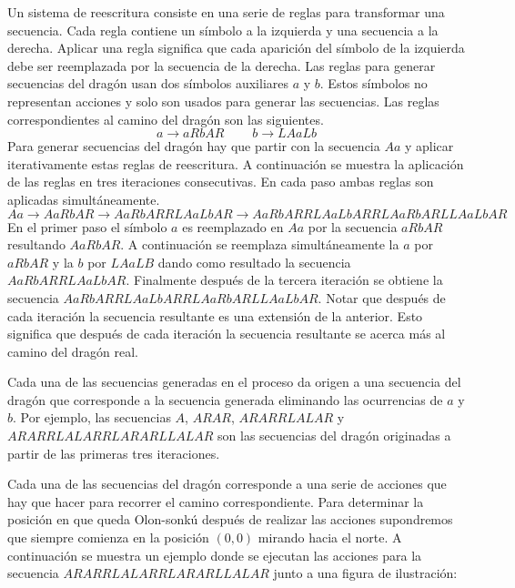 \documentclass{oci}
\begin{document}
Un sistema de reescritura consiste en una serie de reglas para transformar una secuencia.
Cada regla contiene un símbolo a la izquierda y una secuencia a la derecha.
Aplicar una regla significa que cada aparición del símbolo de la izquierda debe ser reemplazada por la secuencia de la derecha.
Las reglas para generar secuencias del dragón usan dos símbolos auxiliares $a$ y $b$.
Estos símbolos no representan acciones y solo son usados para generar las secuencias.
Las reglas correspondientes al camino del dragón son las siguientes.
$$a \rightarrow aRbAR \ \ \ \ \ \ \ \ \ \   b \rightarrow LAaLb$$
Para generar secuencias del dragón hay que partir con la secuencia $Aa$ y aplicar iterativamente estas reglas de reescritura.
A continuación se muestra la aplicación de las reglas en tres iteraciones consecutivas.
En cada paso ambas reglas son aplicadas simultáneamente.
$$Aa \rightarrow AaRbAR \rightarrow AaRbARRLAaLbAR \rightarrow AaRbARRLAaLbARRLAaRbARLLAaLbAR$$
En el primer paso el símbolo $a$ es reemplazado en $Aa$ por la secuencia $aRbAR$ resultando $AaRbAR$.
A continuación se reemplaza simultáneamente la $a$ por $aRbAR$ y la $b$ por $LAaLB$ dando como resultado la secuencia $AaRbARRLAaLbAR$.
Finalmente después de la tercera iteración se obtiene la secuencia $AaRbARRLAaLbARRLAaRbARLLAaLbAR$.
Notar que después de cada iteración la secuencia resultante es una extensión de la anterior.
Esto significa que después de cada iteración la secuencia resultante se acerca más al camino del dragón real.

Cada una de las secuencias generadas en el proceso da origen a una secuencia del dragón que corresponde a la secuencia generada eliminando las ocurrencias de $a$ y $b$.
Por ejemplo, las secuencias $A$, $ARAR$, $ARARRLALAR$ y $ARARRLALARRLARARLLALAR$ son las secuencias del dragón originadas a partir de las primeras tres iteraciones.

Cada una de las secuencias del dragón corresponde a una serie de acciones que hay que hacer para recorrer el camino correspondiente.
Para determinar la posición en que queda Olon-sonkú después de realizar las acciones supondremos que siempre comienza en la posición $(0,0)$ mirando hacia el norte.
A continuación se muestra un ejemplo donde se ejecutan las acciones para la secuencia $ARARRLALARRLARARLLALAR$ junto a una figura de ilustración:
\\
\end{document}
